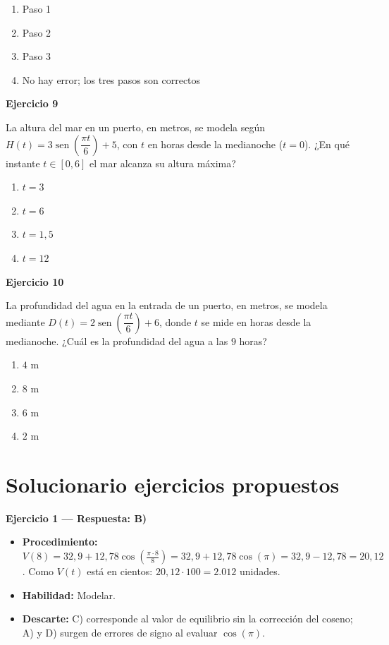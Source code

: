 \documentclass[12pt,letterpaper]{article}
\providecommand{\sen}{\operatorname{sen}}
\begin{document}
\begin{enumerate}[label=\Alph*)]
    \item Paso 1
    \item Paso 2
    \item Paso 3
    \item No hay error; los tres pasos son correctos
\end{enumerate}

\vspace{3.5cm}
\newpage

\textbf{Ejercicio 9}

La altura del mar en un puerto, en metros, se modela según $H(t)=3\sen\left(\dfrac{\pi t}{6}\right)+5$, con $t$ en horas desde la medianoche ($t=0$). ¿En qué instante $t\in[0,6]$ el mar alcanza su altura máxima?

\begin{enumerate}[label=\Alph*)]
    \item $t=3$
    \item $t=6$
    \item $t=1{,}5$
    \item $t=12$
\end{enumerate}

\vspace{3.5cm}

\textbf{Ejercicio 10}

La profundidad del agua en la entrada de un puerto, en metros, se modela mediante $D(t)=2\sen\left(\dfrac{\pi t}{6}\right)+6$, donde $t$ se mide en horas desde la medianoche. ¿Cuál es la profundidad del agua a las $9$ horas?

\begin{enumerate}[label=\Alph*)]
    \item $4\text{ m}$
    \item $8\text{ m}$
    \item $6\text{ m}$
    \item $2\text{ m}$
\end{enumerate}

\vspace{3.5cm}
\newpage

\section{Solucionario ejercicios propuestos}

\textbf{Ejercicio 1 --- Respuesta: B)}
\begin{itemize}[leftmargin=*]
    \item \textbf{Procedimiento:} $V(8)=32{,}9+12{,}78\cos\left(\frac{\pi\cdot8}{8}\right)=32{,}9+12{,}78\cos(\pi)=32{,}9-12{,}78=20{,}12$. Como $V(t)$ está en cientos: $20{,}12\cdot100=2.012$ unidades.
    \item \textbf{Habilidad:} Modelar.
    \item \textbf{Descarte:} C) corresponde al valor de equilibrio sin la corrección del coseno; A) y D) surgen de errores de signo al evaluar $\cos(\pi)$.
\end{itemize}
\end{document}
